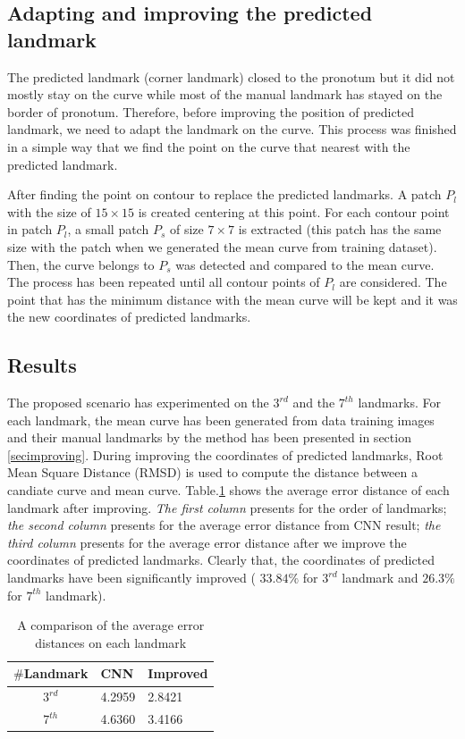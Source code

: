 \documentclass[10pt]{article}
\begin{document}
\subsection{Adapting and improving the predicted landmark}
The predicted landmark (corner landmark) closed to the pronotum but it did not mostly stay on the curve while most of the manual landmark has stayed on the border of pronotum. Therefore, before improving the position of predicted landmark, we need to adapt the landmark on the curve. This process was finished in a simple way that we find the point on the curve that nearest with the predicted landmark.

After finding the point on contour to replace the predicted landmarks. A patch $P_l$ with the size of $15 \times 15$ is created centering at this point. For each contour point in patch $P_l$, a small patch $P_s$ of size $7 \times 7$ is extracted (this patch has the same size with the patch when we generated the mean curve from training dataset). Then, the curve belongs to $P_s$ was detected and compared to the mean curve. The process has been repeated until all contour points of $P_l$ are considered. The point that has the minimum distance with the mean curve will be kept and it was the new coordinates of predicted landmarks.
\subsection{Results}
The proposed scenario has experimented on the $3^{rd}$ and the $7^{th}$ landmarks. For each landmark, the mean curve has been generated from data training images and their manual landmarks by the method has been presented in section \ref{secimproving}. During improving the coordinates of predicted landmarks, Root Mean Square Distance (RMSD) is used to compute the distance between a candiate curve and mean curve. 
Table.\ref{tabledistance2} shows the average error distance of each landmark after improving. \textit{The first column} presents for the order of landmarks; \textit{the second column} presents for the average error distance from CNN result; \textit{the third column} presents for the average error distance after we improve the coordinates of predicted landmarks. Clearly that, the coordinates of predicted landmarks have been significantly improved ( $33.84\%$ for $3^{rd}$ landmark and $26.3\%$ for $7^{th}$ landmark).

\begin{table}[htbp]
\centering
\begin{tabular}{c|p{1.5cm}|p{1.5cm}}

\textbf{$\#$Landmark} & \textbf{CNN} & \textbf{Improved} \\ \hline
$3^{rd}$ & 4.2959 & 2.8421  \\ \hline
$7^{th}$ & 4.6360 & 3.4166 \\ 
\end{tabular}
\caption{A comparison of the average error distances on each landmark }
\label{tabledistance2}
\end{table}
\end{document}
